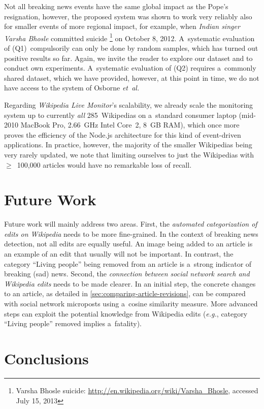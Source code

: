 Not all breaking news events have the same global impact as the Pope's resignation,
however, the proposed system was shown to work very reliably
also for smaller events of more regional impact, for example,
when \emph{Indian singer Varsha Bhosle} committed suicide%
\footnote{Varsha Bhosle suicide: \url{http://en.wikipedia.org/wiki/Varsha_Bhosle},
accessed July 15, 2013} on October 8, 2012.
A~systematic evaluation of (Q1)~compulsorily can only be done by random samples,
which has turned out positive results so far.
Again, we invite the reader to explore our dataset and to conduct own experiments.
A~systematic evaluation of (Q2) requires a~commonly shared dataset,
which we have provided, however, at this point in time, we do not have access to the system
of Osborne \emph{et~al.}

Regarding \emph{Wikipedia Live Monitor}'s scalability,
we already scale the monitoring system
up to currently \emph{all} 285~Wikipedias on a~standard consumer laptop
(mid-2010 MacBook Pro, 2.66~GHz Intel Core~2, 8~GB RAM),
which once more proves the efficiency of the Node.js architecture
for this kind of event-driven applications.
In practice, however, the majority of the smaller Wikipedias
being very rarely updated,
we note that limiting ourselves to just the Wikipedias
with $\geq$~100,000 articles would have no remarkable loss of recall.

\section{Future Work}

Future work will mainly address two areas.
First, the \emph{automated categorization of edits on Wikipedia}
needs to be more fine-grained.
In the context of breaking news detection, not all edits are equally useful.
An image being added to an article is an example of an edit
that usually will not be important.
In contrast, the category ``Living people'' being removed from an article
is a~strong indicator of breaking (sad) news.
Second, the \emph{connection between social network search and Wikipedia edits}
needs to be made clearer. 
In an initial step, the concrete changes to an article, as detailed in
\autoref{sec:comparing-article-revisions}, can be compared with
social network microposts using a~cosine similarity measure.
More advanced steps can exploit the potential knowledge from Wikipedia edits
(\emph{e.g.}, category ``Living people'' removed implies a~fatality).

\section{Conclusions}

